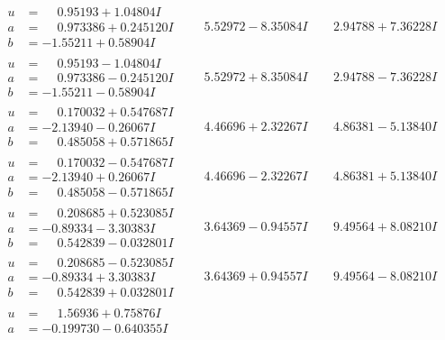 \documentclass[1p]{elsarticle_modified}
\theoremstyle{definition}
\begin{document}
$$\begin{array}{c|c|c}
\begin{aligned}
u &= \phantom{-}0.95193 + 1.04804 I \\
a &= \phantom{-}0.973386 + 0.245120 I \\
b &= -1.55211 + 0.58904 I\end{aligned}
 & \phantom{-}5.52972 - 8.35084 I & \phantom{-}2.94788 + 7.36228 I \\ \hline\begin{aligned}
u &= \phantom{-}0.95193 - 1.04804 I \\
a &= \phantom{-}0.973386 - 0.245120 I \\
b &= -1.55211 - 0.58904 I\end{aligned}
 & \phantom{-}5.52972 + 8.35084 I & \phantom{-}2.94788 - 7.36228 I \\ \hline\begin{aligned}
u &= \phantom{-}0.170032 + 0.547687 I \\
a &= -2.13940 - 0.26067 I \\
b &= \phantom{-}0.485058 + 0.571865 I\end{aligned}
 & \phantom{-}4.46696 + 2.32267 I & \phantom{-}4.86381 - 5.13840 I \\ \hline\begin{aligned}
u &= \phantom{-}0.170032 - 0.547687 I \\
a &= -2.13940 + 0.26067 I \\
b &= \phantom{-}0.485058 - 0.571865 I\end{aligned}
 & \phantom{-}4.46696 - 2.32267 I & \phantom{-}4.86381 + 5.13840 I \\ \hline\begin{aligned}
u &= \phantom{-}0.208685 + 0.523085 I \\
a &= -0.89334 - 3.30383 I \\
b &= \phantom{-}0.542839 - 0.032801 I\end{aligned}
 & \phantom{-}3.64369 - 0.94557 I & \phantom{-}9.49564 + 8.08210 I \\ \hline\begin{aligned}
u &= \phantom{-}0.208685 - 0.523085 I \\
a &= -0.89334 + 3.30383 I \\
b &= \phantom{-}0.542839 + 0.032801 I\end{aligned}
 & \phantom{-}3.64369 + 0.94557 I & \phantom{-}9.49564 - 8.08210 I \\ \hline\begin{aligned}
u &= \phantom{-}1.56936 + 0.75876 I \\
a &= -0.199730 - 0.640355 I \\

\end{aligned}
\end{array}$$
\end{document}
